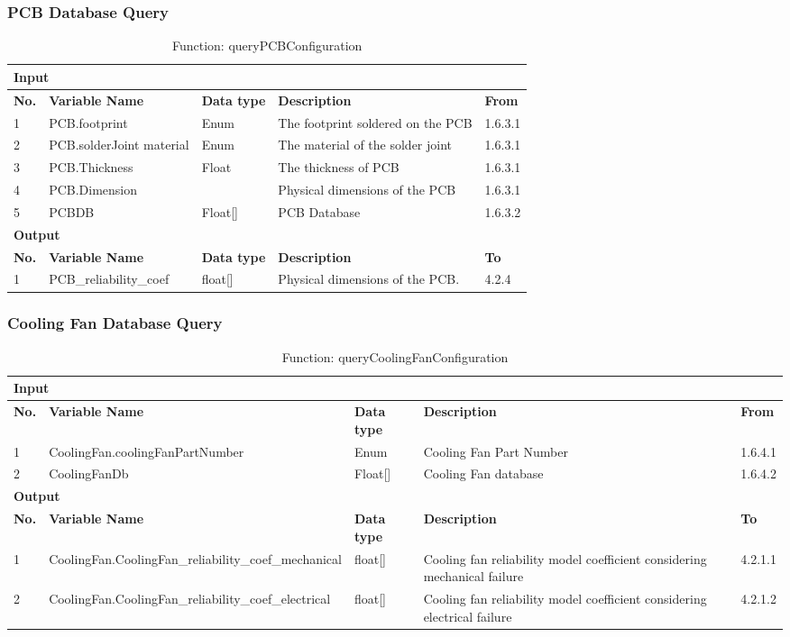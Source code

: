 \documentclass{article}
\begin{document}
\subsubsection{PCB Database Query}
\begin{table}[h]
\centering
\caption{Function: queryPCBConfiguration}
\begin{tabular}{|l|p{3cm}|l|p{6cm}|l|}
\hline
\multicolumn{5}{|l|}{\textbf{Input}} \\ \hline
\textbf{No.} & \textbf{Variable Name} & \textbf{Data type} & \textbf{Description} & \textbf{From} \\ \hline
1 & PCB.footprint & Enum & The footprint soldered on the PCB & 1.6.3.1 \\ \hline
2 & PCB.solderJoint material & Enum & The material of the solder joint & 1.6.3.1 \\ \hline
3 & PCB.Thickness & Float & The thickness of PCB & 1.6.3.1 \\ \hline
4 & PCB.Dimension & & Physical dimensions of the PCB & 1.6.3.1 \\ \hline
5 & PCBDB & Float[] & PCB Database & 1.6.3.2 \\ \hline
\multicolumn{5}{|l|}{\textbf{Output}} \\ \hline
\textbf{No.} & \textbf{Variable Name} & \textbf{Data type} & \textbf{Description} & \textbf{To} \\ \hline
1 & PCB\_reliability\_coef & float[] & Physical dimensions of the PCB. & 4.2.4 \\ \hline
\end{tabular}
\end{table}

\subsubsection{Cooling Fan Database Query}
\begin{table}[h]
\centering
\caption{Function: queryCoolingFanConfiguration}
\begin{tabular}{|l|p{4cm}|l|p{5cm}|l|}
\hline
\multicolumn{5}{|l|}{\textbf{Input}} \\ \hline
\textbf{No.} & \textbf{Variable Name} & \textbf{Data type} & \textbf{Description} & \textbf{From} \\ \hline
1 & CoolingFan.coolingFanPartNumber & Enum & Cooling Fan Part Number & 1.6.4.1 \\ \hline
2 & CoolingFanDb & Float[] & Cooling Fan database & 1.6.4.2 \\ \hline
\multicolumn{5}{|l|}{\textbf{Output}} \\ \hline
\textbf{No.} & \textbf{Variable Name} & \textbf{Data type} & \textbf{Description} & \textbf{To} \\ \hline
1 & CoolingFan.CoolingFan\_reliability\_coef\_mechanical & float[] & Cooling fan reliability model coefficient considering mechanical failure & 4.2.1.1 \\ \hline
2 & CoolingFan.CoolingFan\_reliability\_coef\_electrical & float[] & Cooling fan reliability model coefficient considering electrical failure & 4.2.1.2 \\ \hline
\end{tabular}
\end{table}
\end{document}
